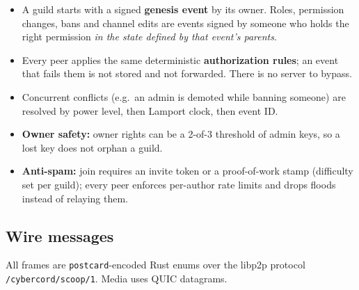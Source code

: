 \documentclass[11pt,a4paper]{article}
\begin{document}
\begin{itemize}
  \item A guild starts with a signed \textbf{genesis event} by its owner. Roles, permission
        changes, bans and channel edits are events signed by someone who holds the right
        permission \emph{in the state defined by that event's parents}.
  \item Every peer applies the same deterministic \textbf{authorization rules}; an event that
        fails them is not stored and not forwarded. There is no server to bypass.
  \item Concurrent conflicts (e.g.\ an admin is demoted while banning someone) are resolved
        by power level, then Lamport clock, then event ID.
  \item \textbf{Owner safety:} owner rights can be a 2-of-3 threshold of admin keys, so a lost
        key does not orphan a guild.
  \item \textbf{Anti-spam:} join requires an invite token or a proof-of-work stamp (difficulty
        set per guild); every peer enforces per-author rate limits and drops floods instead of
        relaying them.
\end{itemize}

\subsection{Wire messages}

All frames are \texttt{postcard}-encoded Rust enums over the libp2p protocol
\texttt{/cybercord/scoop/1}. Media uses QUIC datagrams.
\end{document}
